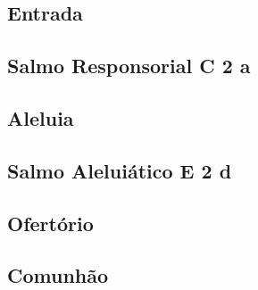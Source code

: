 
\subsection{Entrada}\label{subsection:proprium-sanctorum/in-transfiguratione-domini/introitus}

\AllowPageFlush

\subsection[Salmo Responsorial]{Salmo Responsorial \textmd{C 2 a}}\label{subsection:proprium-sanctorum/in-transfiguratione-domini/psalmus-responsorius}

\AllowPageFlush

\subsection{Aleluia}\label{subsection:proprium-sanctorum/in-transfiguratione-domini/alleluia}

\AllowPageFlush

\subsection[Salmo Aleluiático]{Salmo Aleluiático \textmd{E 2 d}}\label{subsection:proprium-sanctorum/in-transfiguratione-domini/psalmus-alleluiaticus}

\AllowPageFlush

\subsection{Ofertório}\label{subsection:proprium-sanctorum/in-transfiguratione-domini/offertorium}

\AllowPageFlush

\subsection{Comunhão}\label{subsection:proprium-sanctorum/in-transfiguratione-domini/communio}
